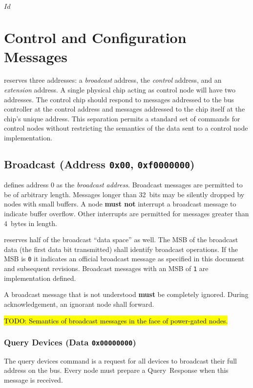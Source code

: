 \svnInfo $Id$

\section{Control and Configuration Messages}
\label{sec:control}

\bus reserves three addresses: a {\em broadcast} address, the {\em control}
address, and an {\em extension} address. A single physical chip acting as
control node will have two addresses. The control chip should respond to
messages addressed to the bus controller at the control address and messages
addressed to the chip itself at the chip's unique address. This separation
permits a standard set of commands for \bus control nodes without restricting
the semantics of the data sent to a control node implementation.

\subsection{Broadcast (Address \texttt{0x00}, \texttt{0xf0000000})}
\label{sec:control-broadcast}
\bus defines address 0 as the \textit{broadcast address}. Broadcast messages
are permitted to be of arbitrary length. Messages longer than 32~bits may be
silently dropped by nodes with small buffers. A node \textbf{must not}
interrupt a broadcast message to indicate buffer overflow. Other interrupts
are permitted for messages greater than 4~bytes in length.

\bus reserves half of the broadcast ``data space'' as well. The MSB of the
broadcast data (the first data bit transmitted) shall identify \bus broadcast
operations. If the MSB is {\tt 0} it indicates an official \bus broadcast
message as specified in this document and subsequent revisions. Broadcast
messages with an MSB of {\tt 1} are implementation defined.

A broadcast message that is not understood \textbf{must} be completely
ignored. During acknowledgement, an ignorant node shall forward.

\hl{TODO: Semantics of broadcast messages in the face of power-gated nodes.}


\subsubsection{Query Devices (Data \texttt{0x00000000})}
The query devices command is a request for all devices to broadcast their full
address on the bus. Every \bus node must prepare a Query~Response when this
message is received.

